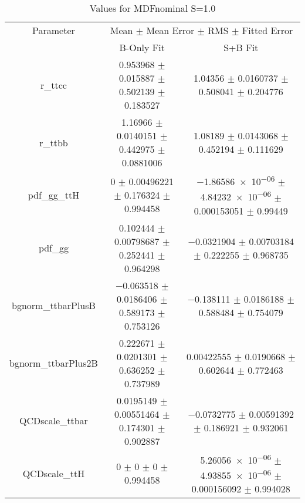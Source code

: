 \begin{table}
\centering
\caption{Values for MDFnominal S=1.0}
\begin{tabular}{ccc}
\toprule
Parameter & \multicolumn{2}{c}{Mean $\pm$ Mean Error $\pm$ RMS $\pm$ Fitted Error}\\
 & B-Only Fit & S+B Fit\\
\midrule
r\_ttcc & \num{0.953968} $\pm$ \num{0.015887} $\pm$ \num{0.502139} $\pm$ \num{0.183527} & \num{1.04356} $\pm$ \num{0.0160737} $\pm$ \num{0.508041} $\pm$ \num{0.204776}\\
r\_ttbb & \num{1.16966} $\pm$ \num{0.0140151} $\pm$ \num{0.442975} $\pm$ \num{0.0881006} & \num{1.08189} $\pm$ \num{0.0143068} $\pm$ \num{0.452194} $\pm$ \num{0.111629}\\
pdf\_gg\_ttH & \num{0} $\pm$ \num{0.00496221} $\pm$ \num{0.176324} $\pm$ \num{0.994458} & \num{-1.86586e-06} $\pm$ \num{4.84232e-06} $\pm$ \num{0.000153051} $\pm$ \num{0.99449}\\
pdf\_gg & \num{0.102444} $\pm$ \num{0.00798687} $\pm$ \num{0.252441} $\pm$ \num{0.964298} & \num{-0.0321904} $\pm$ \num{0.00703184} $\pm$ \num{0.222255} $\pm$ \num{0.968735}\\
bgnorm\_ttbarPlusB & \num{-0.063518} $\pm$ \num{0.0186406} $\pm$ \num{0.589173} $\pm$ \num{0.753126} & \num{-0.138111} $\pm$ \num{0.0186188} $\pm$ \num{0.588484} $\pm$ \num{0.754079}\\
bgnorm\_ttbarPlus2B & \num{0.222671} $\pm$ \num{0.0201301} $\pm$ \num{0.636252} $\pm$ \num{0.737989} & \num{0.00422555} $\pm$ \num{0.0190668} $\pm$ \num{0.602644} $\pm$ \num{0.772463}\\
QCDscale\_ttbar & \num{0.0195149} $\pm$ \num{0.00551464} $\pm$ \num{0.174301} $\pm$ \num{0.902887} & \num{-0.0732775} $\pm$ \num{0.00591392} $\pm$ \num{0.186921} $\pm$ \num{0.932061}\\
QCDscale\_ttH & \num{0} $\pm$ \num{0} $\pm$ \num{0} $\pm$ \num{0.994458} & \num{5.26056e-06} $\pm$ \num{4.93855e-06} $\pm$ \num{0.000156092} $\pm$ \num{0.994028}\\
\bottomrule
\end{tabular}
\end{table}